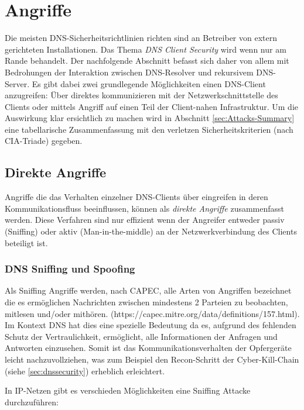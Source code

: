 \chapter{Angriffe}
\label{chap:attacks}

Die meisten DNS-Sicherheitsrichtlinien richten sind an Betreiber von extern gerichteten Installationen. Das Thema \textit{DNS Client Security} wird wenn nur am Rande behandelt. Der nachfolgende Abschnitt befasst sich daher von allem mit Bedrohungen der Interaktion zwischen DNS-Resolver und rekursivem DNS-Server. 
Es gibt dabei zwei grundlegende Möglichkeiten einen DNS-Client anzugreifen: Über direktes kommunizieren mit der Netzwerkschnittstelle des Clients oder mittels Angriff auf einen Teil der Client-nahen Infrastruktur. Um die Auswirkung klar ersichtlich zu machen wird in Abschnitt \ref{sec:Attacks-Summary} eine tabellarische Zusammenfassung mit den verletzen Sicherheitskriterien (nach CIA-Triade) gegeben. 


\section{Direkte Angriffe}

Angriffe die das Verhalten einzelner DNS-Clients über eingreifen in deren Kommunikationsfluss beeinflussen, können als \textit{direkte Angriffe} zusammenfasst werden. Diese Verfahren sind nur effizient wenn der Angreifer entweder passiv (Sniffing) oder aktiv (Man-in-the-middle) an der Netzwerkverbindung des Clients beteiligt ist. 

\subsection{DNS Sniffing und Spoofing}

Als Sniffing Angriffe werden, nach CAPEC, alle Arten von Angriffen bezeichnet die es ermöglichen Nachrichten zwischen mindestens 2 Parteien zu beobachten, mitlesen und/oder mithören. (https://capec.mitre.org/data/definitions/157.html). Im Kontext DNS hat dies eine spezielle Bedeutung da es, aufgrund des fehlenden Schutz der Vertraulichkeit, ermöglicht, alle Informationen der Anfragen und Antworten einzusehen. Somit ist das Kommunikationsverhalten der Opfergeräte leicht nachzuvollziehen, was zum Beispiel den Recon-Schritt der Cyber-Kill-Chain (siehe \ref{sec:dnssecurity}) erheblich erleichtert. 

In IP-Netzen gibt es verschieden Möglichkeiten eine Sniffing Attacke durchzuführen: 

